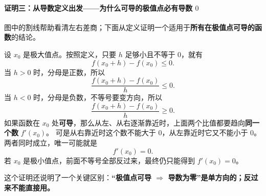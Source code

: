 \clearpage
\begin{proofbox}
\paragraph{证明三：从导数定义出发——为什么可导的极值点必有导数 $0$}
\begin{center}\end{center}

图中的割线帮助看清左右差商；下面从定义证明一个适用于\textbf{所有在极值点可导的函数}的结论。

设 $x_0$ 是极大值点。按照定义，只要 $h$ 足够小且不等于 $0$，就有
\[
f(x_0+h)-f(x_0)\le0.
\]
当 $h>0$ 时，分母是正数，所以
\[
\frac{f(x_0+h)-f(x_0)}{h}\le0.
\]
当 $h<0$ 时，分母是负数，不等号要变方向，所以
\[
\frac{f(x_0+h)-f(x_0)}{h}\ge0.
\]
如果函数在 $x_0$ 处\textbf{可导}，那么从左、从右逐渐靠近时，上面两个比值都要趋向\textbf{同一个数} $f'(x_0)$。
可是从右靠近时这个数不能大于 $0$，从左靠近时它又不能小于 $0$。
两者同时成立，唯一可能就是
\[
\boxed{f'(x_0)=0.}
\]
若 $x_0$ 是极小值点，前面不等号全部反过来，最终仍只能得到 $f'(x_0)=0$。

这个证明还说明了一个关键区别：\textbf{“极值点可导 $\Rightarrow$ 导数为零”是单方向的；反过来不能直接用。}
\end{proofbox}
